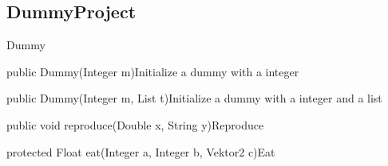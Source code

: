 \subsection{DummyProject}
\begin{absclass}{Dummy} 



    \begin{attributes}
    \end{attributes}

    \begin{constructors}
        \begin{constructor}{public Dummy(Integer m)}{Initialize a dummy with a integer}
            \begin{parameters}
            \end{parameters}
        \end{constructor}

        \begin{constructor}{public Dummy(Integer m, List t)}{Initialize a dummy with a integer and a list}
            \begin{parameters}
            \end{parameters}
        \end{constructor}
    \end{constructors}


    \begin{methods}
        \begin{method}{public void reproduce(Double x, String y)}{Reproduce}
            \begin{parameters}
            \end{parameters}
        \end{method}
        \begin{method}{protected Float eat(Integer a, Integer b, Vektor2 c)}{Eat}
            \begin{parameters}
            \end{parameters}
        \end{method}
    \end{methods}
\end{absclass}


